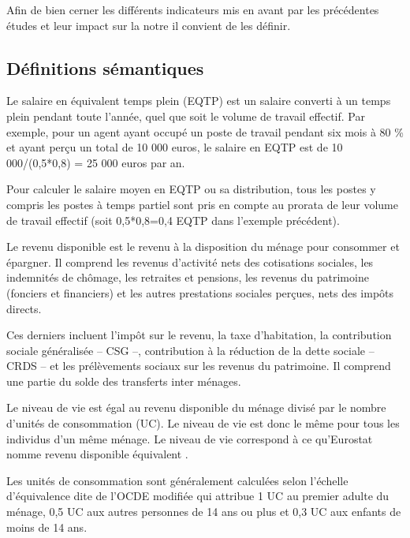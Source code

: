 Afin de bien cerner les différents indicateurs mis en avant par les précédentes études et leur impact sur la notre il convient de les définir.

\subsection{Définitions sémantiques}

\begin{definition}\label{def:salaire-EQTP}
    Le salaire en équivalent temps plein (EQTP) est un salaire converti à un temps plein pendant toute l'année, quel que soit le volume de travail effectif. Par exemple, pour un agent ayant occupé un poste de travail pendant six mois à 80 \% et ayant perçu un total de 10 000 euros, le salaire en EQTP est de 10 000/(0,5*0,8) = 25 000 euros par an. 

Pour calculer le salaire moyen en EQTP ou sa distribution, tous les postes y compris les postes à temps partiel sont pris en compte au prorata de leur volume de travail effectif (soit 0,5*0,8=0,4 EQTP dans l'exemple précédent). 
\end{definition}

\begin{definition}\label{def:revenu-disponible}
Le revenu disponible est le revenu à la disposition du ménage pour consommer et épargner. Il comprend les revenus d'activité nets des cotisations sociales, les indemnités de chômage, les retraites et pensions, les revenus du patrimoine (fonciers et financiers) et les autres prestations sociales perçues, nets des impôts directs.

Ces derniers incluent l'impôt sur le revenu, la taxe d’habitation, la contribution sociale généralisée – CSG –, contribution à la réduction de la dette sociale – CRDS – et les prélèvements sociaux sur les revenus du patrimoine. Il comprend une partie du solde des transferts inter ménages. 
\end{definition}

\begin{definition}\label{def:niveau-vie}
    Le niveau de vie est égal au revenu disponible du ménage divisé par le nombre d'unités de consommation (UC). Le niveau de vie est donc le même pour tous les individus d'un même ménage. Le niveau de vie correspond à ce qu'Eurostat nomme \og revenu disponible équivalent \fg. 

Les unités de consommation sont généralement calculées selon l'échelle d'équivalence dite de l'OCDE modifiée qui attribue 1 UC au premier adulte du ménage, 0,5 UC aux autres personnes de 14 ans ou plus et 0,3 UC aux enfants de moins de 14 ans.
\end{definition}

